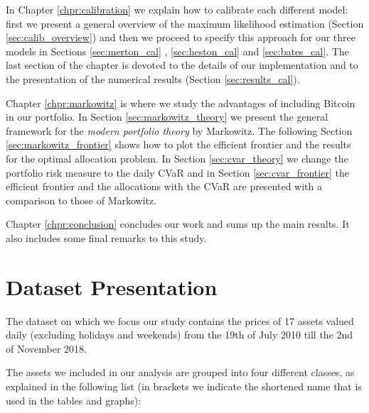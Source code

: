 \bigskip
\noindent
In Chapter \ref{chpr:calibration} we explain how to calibrate each different model: first we present a general overview of the maximum likelihood estimation (Section \ref{sec:calib_overview}) and then we proceed to specify this approach for our three models in Sections \ref{sec:merton_cal} , \ref{sec:heston_cal} and \ref{sec:bates_cal}. 
The last section of the chapter is devoted to the details of our implementation and to the presentation of the numerical results (Section \ref{sec:results_cal}).

\bigskip
\noindent
Chapter \ref{chpr:markowitz} is where we study the advantages of including Bitcoin in our portfolio. In Section \ref{sec:markowitz_theory} we present the general framework for the \textit{modern portfolio theory} by Markowitz. The following Section \ref{sec:markowitz_frontier} shows how to plot the efficient frontier and the results for the optimal allocation problem.
In Section \ref{sec:cvar_theory} we change the portfolio risk measure to the daily CVaR and in Section \ref{sec:cvar_frontier} the efficient frontier and the allocations with the CVaR are presented with a comparison to those of Markowitz.

\bigskip
\noindent
Chapter \ref{chpr:conclusion} concludes our work and sums up the main results. It also includes some final remarks to this study.

\bigskip

\section{Dataset  Presentation}
The dataset on which we focus our study contains the prices of 17 assets valued daily (excluding holidays and weekends) from the 19th of July 2010 till the 2nd of November 2018.

The assets we included in our analysis are grouped into four different classes, as explained in the following list (in brackets we indicate the shortened name that is used in the tables and graphs):


